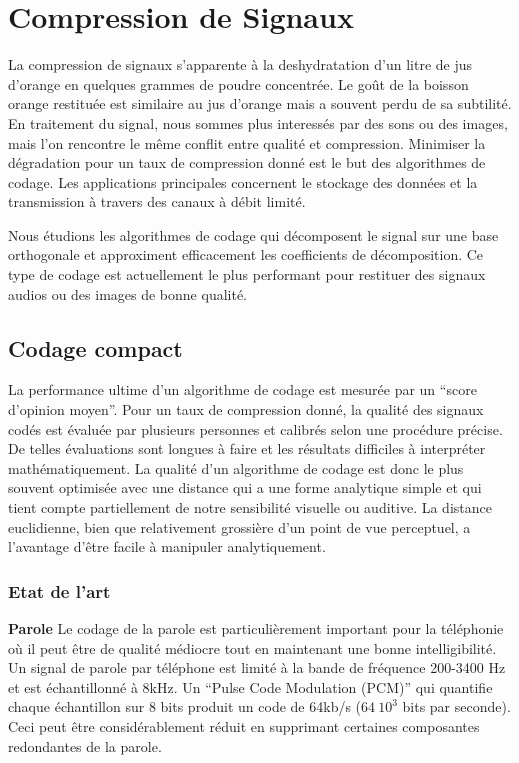 \chapter{Compression de Signaux}
\label{comp-code-chap}

La compression de signaux s'apparente \`a la deshydratation d'un
litre de jus d'orange en quelques grammes de poudre concentr\'ee.
Le go\^ut de la boisson orange restitu\'ee est similaire au jus d'orange
mais a souvent perdu de sa subtilit\'e.
En traitement du signal, nous sommes plus interess\'es
par des sons ou des images, mais l'on rencontre le m\^eme
conflit entre qualit\'e et compression.
Minimiser la d\'egradation pour un taux de compression donn\'e est
le but des algorithmes de codage.
Les applications principales concernent le stockage des donn\'ees
et la transmission \`a travers des canaux \`a d\'ebit limit\'e.

Nous \'etudions les algorithmes de codage
qui d\'ecomposent le
signal sur une base orthogonale et approximent efficacement les
coefficients de d\'ecomposition.
Ce type de codage est actuellement le plus performant pour
restituer des signaux audios ou des images de bonne qualit\'e.

\section{Codage compact}

La performance ultime d'un algorithme de codage est mesur\'ee par
un ``score d'opinion moyen''.
Pour un taux de compression donn\'e,
la qualit\'e des signaux cod\'es est \'evalu\'ee par plusieurs personnes
et calibr\'es selon une proc\'edure pr\'ecise.
De telles \'evaluations sont longues \`a faire et les r\'esultats
difficiles
\`a interpr\'eter math\'ematiquement. La qualit\'e d'un algorithme de codage
est donc le plus souvent optimis\'ee avec une distance qui
a une forme analytique simple et qui tient compte partiellement de
notre sensibilit\'e visuelle ou auditive.
La distance euclidienne, bien que relativement
grossi\`ere d'un point de vue perceptuel,
a l'avantage d'\^etre facile \`a manipuler analytiquement.


\subsection{Etat de l'art}
\label{stateofart}
\noindent
{\bf Parole}
Le codage de la parole est particuli\`erement important pour
la t\'el\'ephonie o\`u il peut \^etre de qualit\'e m\'ediocre tout en
maintenant une bonne intelligibilit\'e.
Un signal de parole par t\'el\'ephone est limit\'e \`a la bande de
fr\'equence 200-3400 Hz et est \'echantillonn\'e \`a 8kHz.
Un ``Pulse Code Modulation (PCM)'' qui quantifie chaque
\'echantillon sur
8 bits produit un code de 64kb/s ($64~10^3$ bits par seconde).
Ceci peut \^etre consid\'erablement r\'eduit en supprimant certaines
composantes redondantes de la parole.

